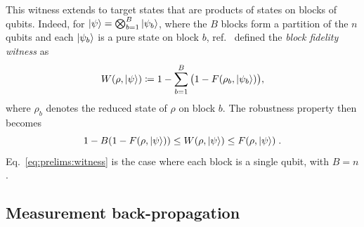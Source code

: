 \documentclass[a4paper,twocolumn,11pt,unpublished]{quantumarticle}
\begin{document}
This witness extends to target states that are products of states on blocks of qubits. Indeed,
for $\ket{\psi}=\bigotimes_{b=1}^{B}\ket{\psi_b}$, where the $B$ blocks form a partition of the $n$ qubits and each $\ket{\psi_b}$ is a pure state on block $b$, ref.~\cite{UC24efficient} defined the \emph{block fidelity witness} as
\begin{equation}
    \label{eq:prelims:blockwitness}
    W(\rho, \ket{\psi})
    \coloneqq 1 -
    \sum_{b=1}^{B}
    \big(1 - F(\rho_b, \ket{\psi_b})\big),
\end{equation}
where $\rho_b$ denotes the reduced state of $\rho$ on block $b$. The robustness property then becomes
\begin{equation}
    \label{eq:prelims:blockwitness:robustness}
    1-B(1-F(\rho, \ket\psi)) \leq W(\rho, \ket\psi)\leq F(\rho, \ket\psi)\; .
\end{equation}
Eq.~\eqref{eq:prelims:witness} is the case where each block is a single qubit, with $B=n$.


\subsection{Measurement back-propagation}
\label{subsection:prelims:backprop}
 
\end{document}
